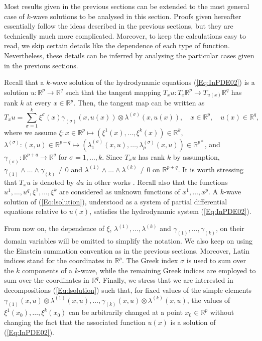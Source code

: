 \documentclass{birkjour}
\theoremstyle{definition}
\theoremstyle{remark}
\numberwithin{equation}{section}
\numberwithin{equation}{section}
\numberwithin{thm}{section}
\numberwithin{equation}{section}
\numberwithin{thm}{section}
\begin{document}
Most results given in the previous sections can be extended to the most general case of $k$-wave solutions to be analysed in this section. Proofs given hereafter essentially follow the  ideas described in the previous sections, but they are technically much more complicated. Moreover, to keep the calculations easy to read, we skip certain details like the dependence of each type of function. Nevertheless, these details can be inferred by analysing the particular cases given in the previous sections. 


Recall that a  {$k$-wave solution} of the hydrodynamic equations (\ref{Eq:InPDE02}) is a solution  $u:\mathbb{R}^p\rightarrow \mathbb{R}^q$ such that the tangent mapping $T_xu:T_x\mathbb{R}^p\rightarrow T_{u(x)}\mathbb{R}^q$ has rank $k$ at every $x\in \mathbb{R}^p$. Then, the tangent map can be written as
\begin{equation}\label{Eq:lsolution}
	T_xu=\sum_{\sigma=1}^k\xi^{\sigma}(x)\gamma_{(\sigma)}(x,u(x))\otimes \lambda^{(\sigma)}(x,u(x)),\quad x\in \mathbb{R}^p,\quad u(x)\in\mathbb{R}^q,
\end{equation}
where we assume $\xi:x\in \mathbb{R}^p\mapsto (\xi^1(x),\ldots,\xi^k(x))\in \mathbb{R}^{k}$, $\lambda^{(\sigma)}:(x,u)\in \mathbb{R}^{p+q}\mapsto (\lambda^{(\sigma)}_1(x,u),\ldots,\lambda^{(\sigma)}_p(x,u))\in \mathbb{R}^{p*}$,  and $\gamma_{(\sigma)}:\mathbb{R}^{p+q}\rightarrow \mathbb{R}^q$ for $\sigma=1,\ldots,k$. Since $T_xu$ has rank $k$ by assumption, $\gamma_{(1)}\wedge\ldots\wedge \gamma_{(k)}\neq 0$ and $\lambda^{(1)}\wedge\ldots\wedge \lambda^{(k)}\neq 0$ on $\mathbb{R}^{p+q}$. It is worth stressing that $T_xu$ is denoted by $du$ in other works \cite{GL91,GV91}. Recall also that the functions $u^1,\ldots,u^q,\xi^1,\ldots,\xi^k$ are considered as unknown functions of $x^1,\ldots,x^p$. A $k$-wave solution of (\ref{Eq:lsolution}), understood as a system of partial differential equations relative to $u(x)$, satisfies the hydrodynamic system (\ref{Eq:InPDE02}).

From now on, the dependence of $\xi$, $\lambda^{(1)},\ldots,\lambda^{(k)}$ and $\gamma_{(1)},\ldots,\gamma_{(k)}$, on their domain variables will be omitted to simplify the notation.   We also keep on using the Einstein summation convention as in the previous sections.  Moreover, Latin indices stand for the coordinates in $\mathbb{R}^p$. The Greek index $\sigma$ is used to sum over the $k$ components of a $k$-wave, while the remaining Greek indices are employed to sum over the coordinates in $\mathbb{R}^q$. Finally, we stress that we are interested in decompositions (\ref{Eq:lsolution}) such that, for fixed values of the simple elements $\gamma_{(1)}(x,u)\otimes \lambda^{(1)}(x,u), \ldots, \gamma_{(k)}(x,u)\otimes \lambda^{(k)}(x,u)$, the values of $\xi^1(x_0),\ldots,\xi^k(x_0)$ can be arbitrarily changed at a point $x_0\in \mathbb{R}^p$ without changing the fact that the associated function $u(x)$ is a solution of (\ref{Eq:InPDE02}).
\end{document}
